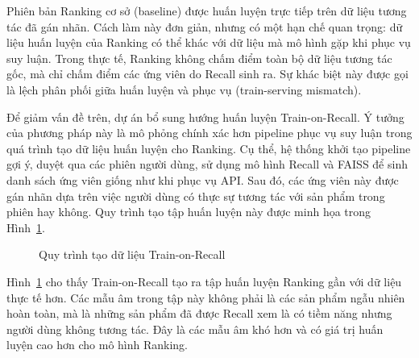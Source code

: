 Phiên bản Ranking cơ sở (baseline) được huấn luyện trực tiếp trên dữ liệu tương tác đã gán nhãn. Cách làm này đơn giản, nhưng có một hạn chế quan trọng: dữ liệu huấn luyện của Ranking có thể khác với dữ liệu mà mô hình gặp khi phục vụ suy luận. Trong thực tế, Ranking không chấm điểm toàn bộ dữ liệu tương tác gốc, mà chỉ chấm điểm các ứng viên do Recall sinh ra. Sự khác biệt này được gọi là lệch phân phối giữa huấn luyện và phục vụ (train-serving mismatch).
\medskip

Để giảm vấn đề trên, dự án bổ sung hướng huấn luyện Train-on-Recall. Ý tưởng của phương pháp này là mô phỏng chính xác hơn pipeline phục vụ suy luận trong quá trình tạo dữ liệu huấn luyện cho Ranking. Cụ thể, hệ thống khởi tạo pipeline gợi ý, duyệt qua các phiên người dùng, sử dụng mô hình Recall và FAISS để sinh danh sách ứng viên giống như khi phục vụ API. Sau đó, các ứng viên này được gán nhãn dựa trên việc người dùng có thực sự tương tác với sản phẩm trong phiên hay không. Quy trình tạo tập huấn luyện này được minh họa trong Hình~\ref{fig:train_on_recall}.

\begin{figure}[H]
\centering
{}
\caption[Quy trình tạo dữ liệu Train-on-Recall]{Quy trình tạo dữ liệu Train-on-Recall}
\label{fig:train_on_recall}
\end{figure}

Hình~\ref{fig:train_on_recall} cho thấy Train-on-Recall tạo ra tập huấn luyện Ranking gần với dữ liệu thực tế hơn. Các mẫu âm trong tập này không phải là các sản phẩm ngẫu nhiên hoàn toàn, mà là những sản phẩm đã được Recall xem là có tiềm năng nhưng người dùng không tương tác. Đây là các mẫu âm khó hơn và có giá trị huấn luyện cao hơn cho mô hình Ranking.
